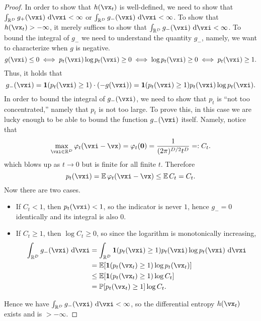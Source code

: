 \documentclass[../../book-main.tex]{subfiles}
\begin{document}
\begin{proof}
    In order to show that \(h(\vx_{t})\) is well-defined, we need to show that \(\int_{\R^{D}}g_{+}(\vxi)\odif{\vxi} < \infty\) or \(\int_{\R^{D}}g_{-}(\vxi) \odif{\vxi} < \infty\). To show that \(h(\vx_{t}) > -\infty\), it merely suffices to show that \(\int_{\R^{D}}g_{-}(\vxi)\odif{\vxi} < \infty\). To bound the integral of \(g_{-}\) we need to understand the quantity \(g_{-}\), namely, we want to characterize when \(g\) is negative.
    \begin{equation}
        g(\vxi) \leq 0 \iff p_{t}(\vxi)\log p_{t}(\vxi) \geq 0 \iff \log p_{t}(\vxi) \geq 0 \iff p_{t}(\vxi) \geq 1.
    \end{equation}
    Thus, it holds that 
    \begin{equation}
        g_{-}(\vxi) = \indvar(p_{t}(\vxi) \geq 1)\cdot (-g(\vxi)) = \indvar(p_{t}(\vxi) \geq 1)p_{t}(\vxi)\log p_{t}(\vxi).
    \end{equation}
    In order to bound the integral of \(g_{-}(\vxi)\), we need to show that \(p_{t}\) is ``not too concentrated,'' namely that \(p_{t}\) is not too large. To prove this, in this case we are lucky enough to be able to bound the function \(g_{-}(\vxi)\) itself. Namely, notice that 
    \begin{equation}
        \max_{\vxi \in \R^{D}}\phi_{t}(\vxi - \vx) = \phi_{t}(\vzero) = \frac{1}{(2\pi)^{D/2}t^{D}} =: C_{t}.
    \end{equation}
    which blows up as \(t \to 0\) but is finite for all finite \(t\). Therefore 
    \begin{equation}
        p_{t}(\vxi) = \Ex \phi_{t}(\vxi - \vx) \leq \Ex C_{t} = C_{t}.
    \end{equation}
    Now there are two cases.
    \begin{itemize}
        \item If \(C_{t} < 1\), then \(p_{t}(\vxi) < 1\), so the indicator is never \(1\), hence \(g_{-} = 0\) identically and its integral is also \(0\).
        \item If \(C_{t} \geq 1\), then \(\log C_{t} \geq 0\), so since the logarithm is monotonically increasing,
        \begin{align}
            \int_{\R^{D}}g_{-}(\vxi)\odif{\vxi}
            &= \int_{\R^{D}}\indvar(p_{t}(\vxi) \geq 1)p_{t}(\vxi)\log p_{t}(\vxi)\odif{\vxi}  \\ 
            &= \Ex[\indvar(p_{t}(\vx_{t}) \geq 1)\log p_{t}(\vx_{t})]  \\ 
            &\leq \Ex[\indvar(p_{t}(\vx_{t}) \geq 1) \log C_{t}] \\ 
            &= \Pr[p_{t}(\vx_{t}) \geq 1]\log C_{t}.
        \end{align}
    \end{itemize}
    Hence we have \(\int_{\R^{D}}g_{-}(\vxi)\odif{\vxi} < \infty\), so the differential entropy \(h(\vx_{t})\) exists and is \(> -\infty\).


\end{proof}
\end{document}
